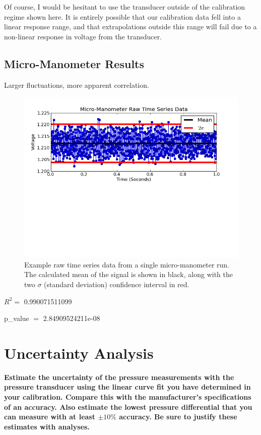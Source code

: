 \documentclass{article}
\begin{document}
Of course, I would be hesitant to use the transducer outside of the
calibration regime shown here. It is entirely possible that our
calibration data fell into a linear response range, and that
extrapolations outside this range will fail due to a non-linear response
in voltage from the transducer.


\subsection*{Micro-Manometer Results}


Larger fluctuations, more apparent correlation. 
  \begin{figure}[!htb]
   \begin{center}
    \includegraphics[width = 12 cm]{figs/micro_time.png}
    \caption{Example raw time series data from a single micro-manometer
    run. The calculated mean of the signal is shown in black, along with
    the two $\sigma$ (standard deviation) confidence interval in
    red.}
    \label{micro-time}
   \end{center}
  \end{figure}


$R^2 =$ 0.990071511099

p\_value $=$ 2.84909524211e-08

\newpage
\section{Uncertainty Analysis}

\textbf{Estimate the uncertainty of the pressure measurements with the
pressure transducer using the linear curve fit you have determined in
your calibration. Compare this with the manufacturer's specifications of
an accuracy. Also estimate the lowest pressure differential that you can
measure with at least $\pm 10\%$ accuracy. Be sure to justify these
estimates with analyses.}
\end{document}
